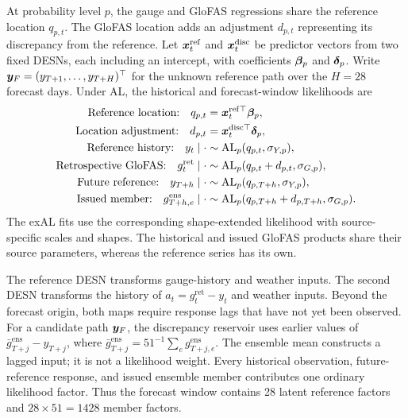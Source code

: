 At probability level \(p\), the gauge and GloFAS regressions share the
reference location \(q_{p,t}\). The GloFAS location adds an adjustment
\(d_{p,t}\) representing its discrepancy from the reference. Let
\(\boldsymbol{x}_t^{\mathrm{ref}}\) and \(\boldsymbol{x}_t^{\mathrm{disc}}\) be predictor
vectors from two fixed DESNs, each including an intercept, with coefficients
\(\boldsymbol{\beta}_p\) and \(\boldsymbol{\delta}_p\). Write
\(\boldsymbol{y}_F=(y_{T+1},\ldots,y_{T+H})^\top\) for the unknown reference path
over the \(H=28\) forecast days. Under AL, the historical and forecast-window
likelihoods are
\begin{equation}
\begin{aligned}
\text{Reference location:}\quad
q_{p,t}&=\boldsymbol{x}_t^{\mathrm{ref}\top}\boldsymbol{\beta}_p,\\
\text{Location adjustment:}\quad
d_{p,t}&=\boldsymbol{x}_t^{\mathrm{disc}\top}\boldsymbol{\delta}_p,\\
\text{Reference history:}\quad
y_t\mid\cdot&\sim\operatorname{AL}_p(q_{p,t},\sigma_{Y,p}),\\
\text{Retrospective GloFAS:}\quad
g_t^{\mathrm{ret}}\mid\cdot&\sim\operatorname{AL}_p(q_{p,t}+d_{p,t},\sigma_{G,p}),\\
\text{Future reference:}\quad
y_{T+h}\mid\cdot&\sim\operatorname{AL}_p(q_{p,T+h},\sigma_{Y,p}),\\
\text{Issued member:}\quad
g_{T+h,e}^{\mathrm{ens}}\mid\cdot&\sim
\operatorname{AL}_p(q_{p,T+h}+d_{p,T+h},\sigma_{G,p}).
\end{aligned}
\label{qdesn2026:eq:glofas-part4-main}
\end{equation}
The exAL fits use the corresponding shape-extended likelihood with
source-specific scales and shapes. The historical and issued GloFAS products
share their source parameters, whereas the reference series has its own.

The reference DESN transforms gauge-history and weather inputs. The second
DESN transforms the history of
\(a_t=g_t^{\mathrm{ret}}-y_t\) and weather inputs. Beyond the forecast origin,
both maps require response lags that have not yet been observed. For a
candidate path \(\boldsymbol{y}_F\), the discrepancy reservoir uses earlier values of
\(\bar g_{T+j}^{\mathrm{ens}}-y_{T+j}\), where
\(\bar g_{T+j}^{\mathrm{ens}}=51^{-1}\sum_e g_{T+j,e}^{\mathrm{ens}}\).
The ensemble mean constructs a lagged input; it is not a likelihood weight.
Every historical observation, future-reference response, and issued ensemble
member contributes one ordinary likelihood factor. Thus the forecast window
contains 28 latent reference factors and \(28\times51=1428\) member factors.

